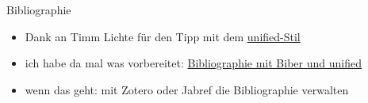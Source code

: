 \begin{frame}[fragile]{Bibliographie}
    \begin{itemize}[<+->]
        \item Dank an Timm Lichte für den Tipp mit dem \href{http://celxj.org/downloads/USS-NoComments.pdf}{unified-Stil}
        \item ich habe da mal was vorbereitet: \href{https://github.com/inktrap/LaTeXKurs/tree/master/4/tex/biber/}{Bibliographie mit Biber und unified}
        \item wenn das geht: mit Zotero oder Jabref die Bibliographie verwalten
    \end{itemize}
\end{frame}
